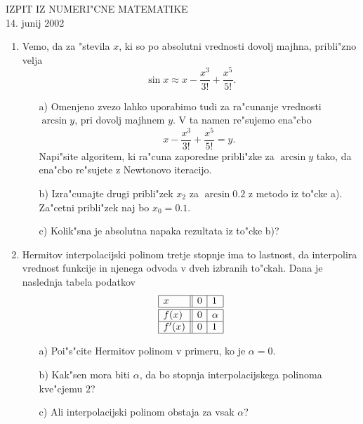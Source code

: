 
\begin{center}
  IZPIT IZ NUMERI"CNE MATEMATIKE\\
  14. junij 2002
\end{center}

\begin{enumerate}

  \item Vemo, da za "stevila $x$, ki so po absolutni vrednosti dovolj majhna,
    pribli"zno velja
    $$\sin{x}\approx x-\frac{x^3}{3!}+\frac{x^5}{5!}.$$
    \begin{itemize}
       \item[a)] Omenjeno zvezo lahko uporabimo tudi za ra"cunanje vrednosti
        $\arcsin{y}$, pri dovolj majhnem $y$. V ta namen re"sujemo
        ena"cbo
        $$x-\frac{x^3}{3!}+\frac{x^5}{5!}=y.$$
        Napi"site algoritem, ki ra"cuna zaporedne pribli"zke za $\arcsin{y}$
        tako, da ena"cbo re"sujete z Newtonovo iteracijo.
       \item[b)]
        Izra"cunajte drugi pribli"zek $x_2$ za $\arcsin{0.2}$ z metodo iz
        to"cke a). Za"cetni pribli"zek naj bo $x_0=0.1$.
       \item[c)] Kolik"sna je absolutna napaka rezultata iz to"cke b)?
    \end{itemize}

  \item Hermitov interpolacijski polinom tretje stopnje ima to lastnost, da 
    interpolira vrednost funkcije in njenega odvoda v dveh izbranih to"ckah.
    Dana je naslednja tabela podatkov
    $$
        \begin{array}{|l||l|l|}
          \hline
          x & 0 & 1 \\ \hline\hline
          f(x) & 0 & \alpha \\ \hline
          f'(x) & 0 & 1\\ \hline
        \end{array}
    $$
     
     \begin{itemize}
      \item[a)] Poi"s"cite Hermitov polinom v primeru, ko je $\alpha=0$.
      \item[b)] Kak"sen mora biti $\alpha$, da bo stopnja interpolacijskega 
      polinoma kve"cjemu $2$?
      \item[c)] Ali interpolacijski polinom obstaja za vsak $\alpha$?
     \end{itemize}   
\end{enumerate}


